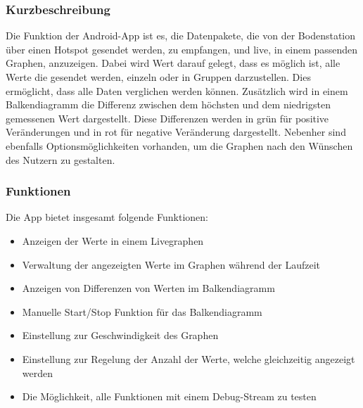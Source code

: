 \subsubsection{Kurzbeschreibung}
Die Funktion der Android-App ist es, die Datenpakete, die von der Bodenstation über einen Hotspot gesendet werden, zu empfangen, und live, in einem passenden Graphen, anzuzeigen. Dabei wird Wert darauf gelegt, dass es möglich ist, alle Werte die gesendet werden, einzeln oder in Gruppen darzustellen. Dies ermöglicht, dass alle Daten verglichen werden können. Zusätzlich wird in einem Balkendiagramm die Differenz zwischen dem höchsten und dem niedrigsten gemessenen Wert dargestellt. Diese Differenzen werden in grün für positive Veränderungen und in rot für negative Veränderung dargestellt. Nebenher sind ebenfalls Optionsmöglichkeiten vorhanden, um die Graphen nach den Wünschen des Nutzern zu gestalten.

\subsubsection{Funktionen}
Die App bietet insgesamt folgende Funktionen:
\begin{itemize}
	\item Anzeigen der Werte in einem Livegraphen
	\item Verwaltung der angezeigten Werte im Graphen während der Laufzeit
	\item Anzeigen von Differenzen von Werten im Balkendiagramm
	\item Manuelle Start/Stop Funktion für das Balkendiagramm
	\item Einstellung zur Geschwindigkeit des Graphen
	\item Einstellung zur Regelung der Anzahl der Werte, welche gleichzeitig angezeigt werden
	\item Die Möglichkeit, alle Funktionen mit einem Debug-Stream zu testen
\end{itemize}
